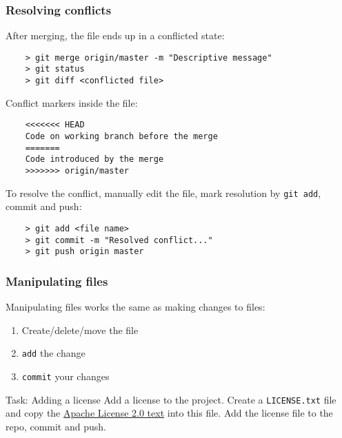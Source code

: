 \begin{frame}[fragile]
	\frametitle{Resolving conflicts}
	
	After merging, the file ends up in a conflicted state:
	\begin{verbatim}
	> git merge origin/master -m "Descriptive message"
	> git status
	> git diff <conflicted file>	
	\end{verbatim}	
	
	Conflict markers inside the file:
	\begin{verbatim}
	<<<<<<< HEAD
	Code on working branch before the merge
	=======
	Code introduced by the merge
	>>>>>>> origin/master
	\end{verbatim}

	To resolve the conflict, manually edit the file, mark resolution by \texttt{git add}, commit and push:
	\begin{verbatim}
	> git add <file name>
	> git commit -m "Resolved conflict..."
	> git push origin master
	\end{verbatim}
	
\end{frame}




\begin{frame}[fragile]

\frametitle{Manipulating files}
	
Manipulating files works the same as making changes to files:
\begin{enumerate}
	\item Create/delete/move the file
	\item \texttt{add} the change
	\item \texttt{commit} your changes
\end{enumerate}

\begin{block}{Task: Adding a license}
	Add a license to the project. Create a \texttt{LICENSE.txt} file and copy the \href{https://choosealicense.com/licenses/apache-2.0/}{Apache License 2.0 text} into this file. Add the license file to the repo, commit and push.
\end{block}
	
\end{frame}


